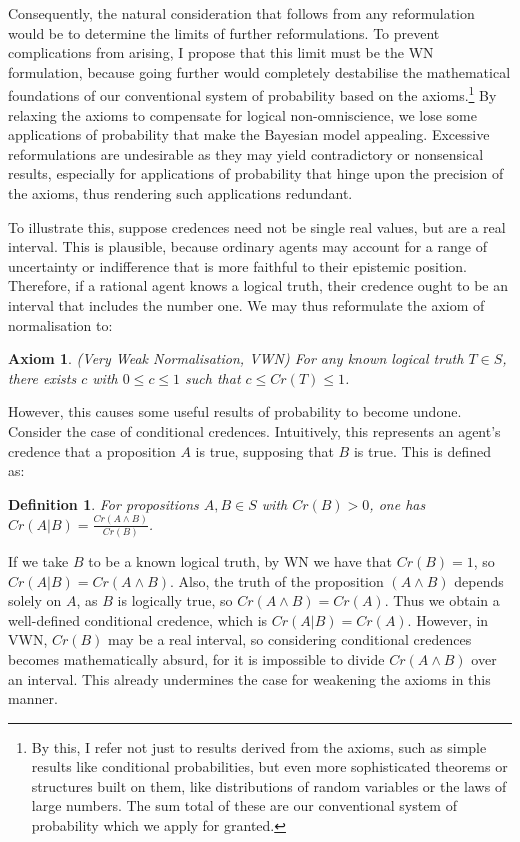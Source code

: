 \documentclass[12pt]{article}
\newtheorem{definition}{Definition}
\newtheorem{axiom}{Axiom}
\begin{document}
Consequently, the natural consideration that follows from any reformulation would be to determine the limits of further reformulations. To prevent complications from arising, I propose that this limit must be the WN formulation, because going further would completely destabilise the mathematical foundations of our conventional system of probability based on the axioms.\footnote{By this, I refer not just to results derived from the axioms, such as simple results like conditional probabilities, but even more sophisticated theorems or structures built on them, like distributions of random variables or the laws of large numbers. The sum total of these are our conventional system of probability which we apply for granted.}  By relaxing the axioms to compensate for logical non-omniscience, we lose some applications of probability that make the Bayesian model appealing.\autocite[436]{oup} Excessive reformulations are undesirable as they may yield contradictory or nonsensical results, especially for applications of probability that hinge upon the precision of the axioms, thus rendering such applications redundant.

To illustrate this, suppose credences need not be single real values, but are a real interval. This is plausible, because ordinary agents may account for a range of uncertainty or indifference that is more faithful to their epistemic position. Therefore, if a rational agent knows a logical truth, their credence ought to be an interval that includes the number one.\autocite{sep} We may thus reformulate the axiom of normalisation to:
\begin{axiom}
    (Very Weak Normalisation, VWN) For any known logical truth $T\in S$, there exists $c$ with $0\leq c\leq 1$ such that $c\leq Cr(T)\leq1$.
\end{axiom}
However, this causes some useful results of probability to become undone. Consider the case of conditional credences. Intuitively, this represents an agent's credence that a proposition $A$ is true, supposing that $B$ is true.\autocite[32]{bdrc} This is defined as:
\begin{definition}
    For propositions $A,B\in S$ with $Cr(B)>0$, one has $Cr(A|B)=\frac{Cr(A\land B)}{Cr(B)}$.
\end{definition}
If we take $B$ to be a known logical truth, by WN we have that $Cr(B)=1$, so $Cr(A|B)=Cr(A\land B)$. Also, the truth of the proposition $(A\land B)$ depends solely on $A$, as $B$ is logically true, so $Cr(A\land B)=Cr(A)$. Thus we obtain a well-defined conditional credence, which is $Cr(A|B)=Cr(A)$. However, in VWN, $Cr(B)$ may be a real interval, so considering conditional credences becomes mathematically absurd, for it is impossible to divide $Cr(A\land B)$ over an interval. This already undermines the case for weakening the axioms in this manner.
\end{document}
